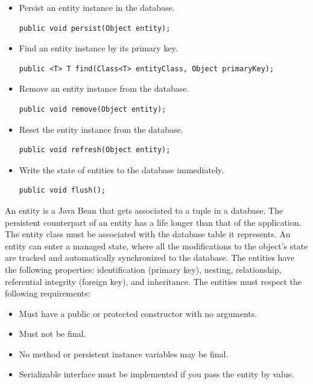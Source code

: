 \documentclass[12pt, a4paper]{report}
\begin{document}
        \begin{itemize}
            \item Persist an entity instance in the database.
                \begin{lstlisting}[style=Java]
public void persist(Object entity);
                \end{lstlisting}
            \item Find an entity instance by its primary key.
                \begin{lstlisting}[style=Java]
public <T> T find(Class<T> entityClass, Object primaryKey); 
                \end{lstlisting}
            \item Remove an entity instance from the database.
                \begin{lstlisting}[style=Java]
public void remove(Object entity); 
                \end{lstlisting}
            \item Reset the entity instance from the database.
                \begin{lstlisting}[style=Java]
public void refresh(Object entity); 
                \end{lstlisting}
            \item Write the state of entities to the database immediately.
                \begin{lstlisting}[style=Java]
public void flush();
                \end{lstlisting}
        \end{itemize}
        An entity is a Java Bean that gets associated to a tuple in a database. The persistent counterpart of an entity has a life longer than that of the application. 
        The entity class must be associated with the database table it represents. An entity can enter a managed state, where all the modifications to the object's state
        are tracked and automatically synchronized to the database. The entities have the following properties: identification (primary key), nesting, relationship, 
        referential integrity (foreign key), and inheritance. The entities must respect the following requirements:
        \begin{itemize}
            \item Must have a public or protected constructor with no arguments. 
            \item Must not be final.
            \item No method or persistent instance variables may be final.
            \item Serializable interface must be implemented if you pass the entity by value.
        \end{itemize}
        
\end{document}
